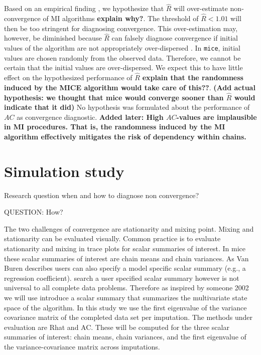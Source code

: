 \documentclass[Royal,times,sageh]{sagej}
\begin{document}
Based on an empirical finding \citep{lace07}, we hypothesize that
\(\widehat{R}\) will over-estimate non-convergence of MI algorithms
\textbf{explain why?}. The threshold of \(\widehat{R} < 1.01\) will then
be too stringent for diagnosing convergence. This over-estimation may,
however, be diminished because \(\widehat{R}\) can falsely diagnose
convergence if initial values of the algorithm are not appropriately
over-dispersed \citep[p.~437]{broo98}. In \texttt{mice}, initial values
are chosen randomly from the observed data. Therefore, we cannot be
certain that the initial values are over-dispersed. We expect this to
have little effect on the hypothesized performance of \(\widehat{R}\)
\textbf{explain that the randomness induced by the MICE algorithm would
take care of this??}. \textbf{(Add actual hypothesis: we thought that
mice would converge sooner than \(\widehat{R}\) would indicate that it
did)} No hypothesis was formulated about the performance of \(AC\) as
convergence diagnostic. \textbf{Added later: High \(AC\)-values are
implausible in MI procedures. That is, the randomness induced by the MI
algorithm effectively mitigates the risk of dependency within chains.}

\hypertarget{simulation-study}{%
\section{Simulation study}\label{simulation-study}}

Research question when and how to diagnose non convergence?

QUESTION: How?

The two challenges of convergence are stationarity and mixing point.
Mixing and stationarity can be evaluated visually. Common practice is to
evaluate stationarity and mixing in trace plots for scalar summaries of
interest. In mice these scalar summaries of interest are chain means and
chain variances. As Van Buren describes users can also specify a model
specific scalar summary (e.g., a regression coefficient). search a user
specified scalar summary however is not universal to all complete data
problems. Therefore as inspired by someone 2002 we will use introduce a
scalar summary that summarizes the multivariate state space of the
algorithm. In this study we use the first eigenvalue of the variance
covariance matrix of the completed data set per imputation. The methods
under evaluation are Rhat and AC. These will be computed for the three
scalar summaries of interest: chain means, chain variances, and the
first eigenvalue of the variance-covariance matrix across imputations.
\end{document}
